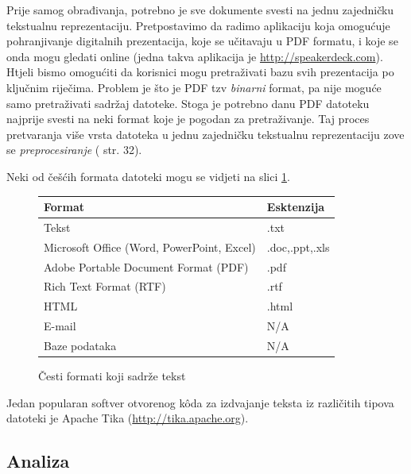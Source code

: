 \documentclass[a4paper,twoside,12pt]{scrreprt}
\begin{document}
Prije samog obrađivanja, potrebno je sve dokumente svesti na jednu zajedničku tekstualnu reprezentaciju. Pretpostavimo da radimo aplikaciju koja omogućuje pohranjivanje digitalnih prezentacija, koje se učitavaju u PDF formatu, i koje se onda mogu gledati online (jedna takva aplikacija je \url{http://speakerdeck.com}). Htjeli bismo omogućiti da korisnici mogu pretraživati bazu svih prezentacija po ključnim riječima. Problem je što je PDF tzv \textit{binarni} format, pa nije moguće samo pretraživati sadržaj datoteke. Stoga je potrebno danu PDF datoteku najprije svesti na neki format koje je pogodan za pretraživanje. Taj proces pretvaranja više vrsta datoteka u jednu zajedničku tekstualnu reprezentaciju zove se \textit{preprocesiranje} (\cite{taming} str. 32).

Neki od češćih formata datoteki mogu se vidjeti na slici \ref{formats}.

{\renewcommand{\arraystretch}{1.2}
\begin{figure}[H]
  \centering
  \begin{tabular}{|l|l|}
    \hline
    \textbf{Format}                            & \textbf{Esktenzija} \\
    \hline
    Tekst                                      & .txt                \\
    \hline
    Microsoft Office (Word, PowerPoint, Excel) & .doc,.ppt,.xls      \\
    \hline
    Adobe Portable Document Format (PDF)       & .pdf                \\
    \hline
    Rich Text Format (RTF)                     & .rtf                \\
    \hline
    HTML                                       & .html               \\
    \hline
    E-mail                                     & N/A                 \\
    \hline
    Baze podataka                              & N/A                 \\
    \hline
  \end{tabular}
  \caption{Česti formati koji sadrže tekst}
  \label{formats}
\end{figure}
}

Jedan popularan softver otvorenog kôda za izdvajanje teksta iz različitih tipova datoteki je Apache Tika (\url{http://tika.apache.org}).

\subsection{Analiza}
\end{document}
